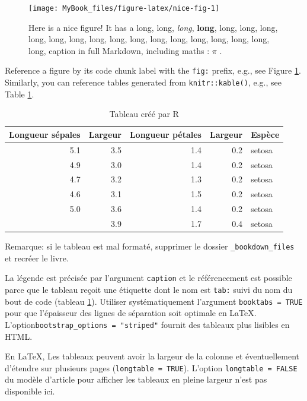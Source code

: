 \documentclass[
  11pt,
  american,
  a4paper,
  extrafontsizes,onecolumn,openright
  ]{memoir}
\begin{document}
\begin{figure}

{\centering \texttt{[image: MyBook\_files/figure-latex/nice-fig-1]} 

}

\caption{Here is a nice figure! It has a long, long, \emph{long}, \textbf{long}, long, long, long, long, long, long, long, long, long, long, long, long, long, long, long, long, caption in full Markdown, including maths : \(\pi\) .}\label{fig:nice-fig}
\end{figure}

\normalsize

Reference a figure by its code chunk label with the \texttt{fig:} prefix, e.g., see Figure \ref{fig:nice-fig}. Similarly, you can reference tables generated from \texttt{knitr::kable()}, e.g., see Table \ref{tab:kable}.

\scriptsize

\begin{longtable}[t]{rrrrl}
\caption{\label{tab:kable}Tableau créé par R}\\
\toprule
Longueur sépales & Largeur & Longueur pétales & Largeur & Espèce\\
\midrule
5.1 & 3.5 & 1.4 & 0.2 & setosa\\
4.9 & 3.0 & 1.4 & 0.2 & setosa\\
4.7 & 3.2 & 1.3 & 0.2 & setosa\\
4.6 & 3.1 & 1.5 & 0.2 & setosa\\
5.0 & 3.6 & 1.4 & 0.2 & setosa\\
\addlinespace
5.4 & 3.9 & 1.7 & 0.4 & setosa\\
\bottomrule
\end{longtable}

\normalsize


Remarque: si le tableau est mal formaté, supprimer le dossier \texttt{\_bookdown\_files} et recréer le livre.

La légende est précisée par l'argument \texttt{caption} et le référencement est possible parce que le tableau reçoit une étiquette dont le nom est \texttt{tab:} suivi du nom du bout de code (tableau \ref{tab:kable}).
Utiliser systématiquement l'argument \texttt{booktabs\ =\ TRUE} pour que l'épaisseur des lignes de séparation soit optimale en LaTeX.
L'option\break \texttt{bootstrap\_options\ =\ "striped"} fournit des tableaux plus lisibles en HTML.

En LaTeX, Les tableaux peuvent avoir la largeur de la colonne et éventuellement d'étendre sur plusieurs pages (\texttt{longtable\ =\ TRUE}).
L'option \texttt{longtable\ =\ FALSE} du modèle d'article pour afficher les tableaux en pleine largeur n'est pas disponible ici.
\end{document}
